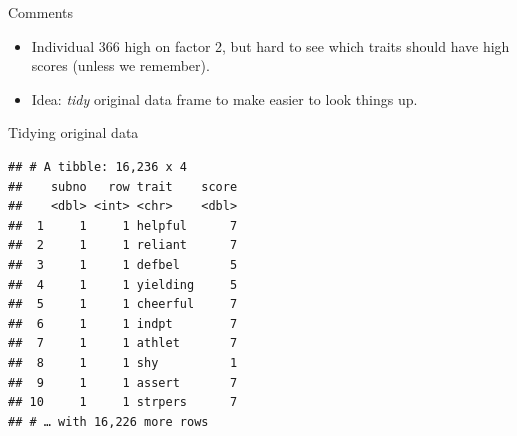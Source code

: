 \documentclass[ignorenonframetext,]{beamer}
\newenvironment{Shaded}{\begin{snugshade}}{\end{snugshade}}
\newcommand{\DataTypeTok}[1]{\textcolor[rgb]{0.13,0.29,0.53}{#1}}
\newcommand{\KeywordTok}[1]{\textcolor[rgb]{0.13,0.29,0.53}{\textbf{#1}}}
\newcommand{\NormalTok}[1]{#1}
\newcommand{\OperatorTok}[1]{\textcolor[rgb]{0.81,0.36,0.00}{\textbf{#1}}}
\newcommand{\StringTok}[1]{\textcolor[rgb]{0.31,0.60,0.02}{#1}}
\begin{document}
\begin{frame}{Comments}
\protect\hypertarget{comments-39}{}

\begin{itemize}
\item
  Individual 366 high on factor 2, but hard to see which traits should
  have high scores (unless we remember).
\item
  Idea: \emph{tidy} original data frame to make easier to look things
  up.
\end{itemize}

\end{frame}

\begin{frame}[fragile]{Tidying original data}
\protect\hypertarget{tidying-original-data}{}

\scriptsize

\begin{Shaded}
\end{Shaded}

\begin{verbatim}
## # A tibble: 16,236 x 4
##    subno   row trait    score
##    <dbl> <int> <chr>    <dbl>
##  1     1     1 helpful      7
##  2     1     1 reliant      7
##  3     1     1 defbel       5
##  4     1     1 yielding     5
##  5     1     1 cheerful     7
##  6     1     1 indpt        7
##  7     1     1 athlet       7
##  8     1     1 shy          1
##  9     1     1 assert       7
## 10     1     1 strpers      7
## # … with 16,226 more rows
\end{verbatim}

\normalsize

\end{frame}
\end{document}
